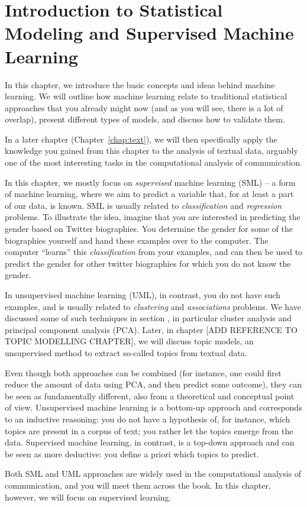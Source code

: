 \chapter{Introduction to Statistical Modeling and Supervised Machine Learning}
\label{chap:introsml}
In this chapter, we introduce the basic concepts and ideas behind
machine learning.  We will outline how machine learning relate to
traditional statistical approaches that you already might now (and as
you will see, there is a lot of overlap), present different types of
models, and discuss how to validate them.

In a later chapter (Chapter~\ref{chap:text}), we will then
specifically apply the knowledge you gained from this chapter to the
analysis of textual data, arguably one of the most interesting tasks
in the computational analysis of communication.

In this chapter, we mostly focus on \emph{supervised} machine learning (SML) 
-- a form of machine learning, where we aim to predict a variable
that, for at least a part of our data, is known. SML is usually related to \textit{classification} and \textit{regression}  problems. To illustrate the
idea, imagine that you are interested in predicting the gender based
on Twitter biographies. You determine the gender for some of the
biographies yourself and hand these examples over to the computer. The
computer ``learns'' this \textit{classification} from your examples, and can then be used to predict the gender for other twitter biographies for which you do not
know the gender.

In unsupervised machine learning (UML), in contrast, you do not have such
examples, and is usually related to \textit{clustering} and \textit{associations} problems. We have discussed some of such techniques in section , in particular cluster analysis and
principal component analysis (PCA).
Later, in chapter [ADD REFERENCE TO TOPIC MODELLING CHAPTER], we will
discuss topic models, an unsupervised method to extract so-called
topics from textual data.

Even though both approaches can be combined (for instance, one could
first reduce the amount of data using PCA, and then predict some
outcome), they can be seen as fundamentally different, also from a
theoretical and conceptual point of view.  Unsupervised machine
learning is a bottom-up approach and corresponds to an inductive
reasoning: you do not have a hypothesis of, for instance, which topics
are present in a corpus of text; you rather let the topics emerge from
the data.  Supervised machine learning, in contrast, is a top-down
approach and can be seen as more deductive: you define a priori which
topics to predict.

Both SML and UML approaches are widely used in the computational analysis of communication, and you will meet them across the book.
In this chapter, however, we will focus on supervised learning.








